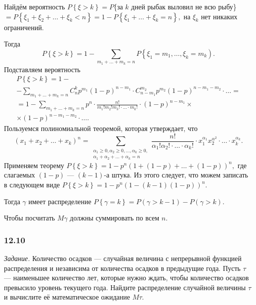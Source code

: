 \begin{enumerate}[label=\alph*)]
Найдём вероятность
$P \left\{ \xi > k \right\} = P$\{за $k$ дней рыбак выловил не всю рыбу\}
$= P \left\{ \xi_1 + \xi_2 + \dotsc + \xi_k < n \right\} = 1 - P \left\{ \xi_1 + \dotsc + \xi_k = n \right\},$
на $ \xi_k$ нет никаких ограничений.

Тогда
$$P \left\{ \xi > k \right\} =
1 - \sum \limits_{m_1 + \dotsc + m_k = n} P \left\{ \xi_1 = m_1, \dotsc, \xi_k = m_k \right).$$
Подставляем вероятность
\begin{equation*}
\begin{split}
P \left\{ \xi > k \right\} =
1 - \\
- \sum \limits_{m_1 + \dotsc + m_k = n} C_n^k p^{m_1} \left( 1-p \right)^{n-m_1} \cdot C_{n-m_1}^{m_2} p^{m_2} \left( 1-p \right)^{n-m_1 - m_2} \cdot \dotsc = \\
= 1 - \sum \limits_{m_1 + \dotsc + m_k = n} p^n \cdot
\frac{n!}{m_1!m_2!m_3! \cdot \dotsc \cdot m_k!} \cdot
\left( 1-p \right)^{n-m_1} \times \\
 \times \left( 1-p \right)^{n-m_1 - m_2} \cdot
\dotsc.
\end{split}
\end{equation*}
Пользуемся полиномиальной теоремой, которая утверждает, что
$$ \left( x_1 + x_2 + \dotsc + x_k \right)^n =
\sum_{ \substack{ \alpha_1 \geq 0, \alpha_2 \geq 0, \dotsc, \alpha_k \geq 0, \\ \alpha_1 + \alpha_2 + \dotsc + \alpha_k = n}}
\frac{n!}{ \alpha_1! \alpha_2! \cdot \dotsc \cdot \alpha_k!} \cdot x_1^{ \alpha_1} x_2^{ \alpha^2} \cdot \dotsc \cdot x_k^{ \alpha_k}.$$
Применяем теорему $P \left\{ \xi > k \right\} = 1 - p^n \left( 1 + \left( 1-p \right) + \dotsc + \left( 1-p \right) \right)^n,$
где слагаемых $ \left( 1-p \right) $ --- $ \left( k-1 \right) $-а штука.
Из этого следует, что можем записать в следующем виде $P \left\{ \xi > k \right\} = 1 - p^n \left( 1 - \left( k-1 \right) \left( 1-p \right) \right)^n$.

Тогда $ \gamma $ имеет распределение $P \left\{ \gamma= k \right\} = P \left( \gamma > k-1 \right) - P \left( \gamma > k \right) $.

Чтобы посчитать $M \gamma $ должны суммировать по всем $n$.
\end{enumerate}

\subsubsection*{12.10}

\textit{Задание.} Количество осадков --- случайная величина с непрерывной функцией распределения и независима от количества осадков в предыдущие года.
Пусть $ \tau $ --- наименьшее количество лет, которые нужно ждать, чтобы количество осадков превысило уровень текущего года.
Найдите распределение случайной величины $ \tau $ и вычислите её математическое ожидание $M \tau $.

